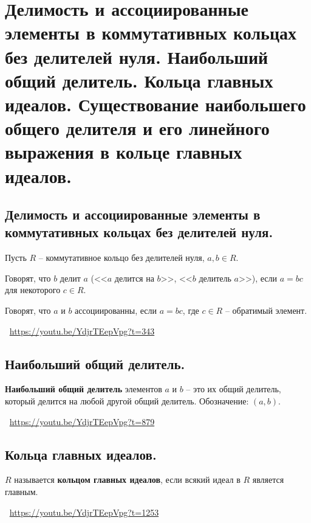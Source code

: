 \section{Делимость и ассоциированные элементы в коммутативных кольцах без делителей нуля. Наибольший общий делитель. Кольца главных идеалов. Существование наибольшего общего делителя и его линейного выражения в кольце главных идеалов.}

\subsection{Делимость и ассоциированные элементы в коммутативных кольцах без делителей нуля.}
Пусть $R$ -- коммутативное кольцо без делителей нуля, $a, b \in R$.
\begin{definition}
    Говорят, что $b$ делит $a$ (<<$a$ делится на $b$>>, <<$b$ делитель $a$>>), если $a = bc$ для некоторого $c \in R$.
\end{definition}
\begin{definition}
    Говорят, что $a$ и $b$ ассоциированны, если $a = bc$, где $c \in R$ -- обратимый элемент.
\end{definition}
\large \faYoutube \normalsize $\>$ \url{https://youtu.be/YdjrTEepVpg?t=343}

\subsection{Наибольший общий делитель.}
\begin{definition}
    \textbf{Наибольший общий делитель} элементов $a$ и $b$ -- это их общий делитель, который делится на любой другой общий делитель. Обозначение: $(a, b)$.
\end{definition}
\large \faYoutube \normalsize $\>$ \url{https://youtu.be/YdjrTEepVpg?t=879}

\subsection{Кольца главных идеалов.}
\begin{definition}
    $R$ называется \textbf{кольцом главных идеалов}, если всякий идеал в $R$ является главным.
\end{definition}
\large \faYoutube \normalsize $\>$ \url{https://youtu.be/YdjrTEepVpg?t=1253}

